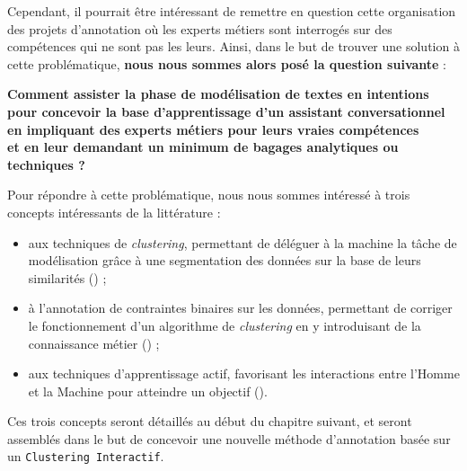 	
	Cependant, il pourrait être intéressant de remettre en question cette organisation des projets d'annotation où les experts métiers sont interrogés sur des compétences qui ne sont pas les leurs.
	Ainsi, dans le but de trouver une solution à cette problématique, \textbf{nous nous sommes alors posé la question suivante} :
	\begin{leftBarImportantGreen}
		\begin{center}
		\textbf{
			Comment assister la phase de modélisation de textes en intentions \\
			pour concevoir la base d'apprentissage d'un assistant conversationnel \\
			en impliquant des experts métiers pour leurs vraies compétences \\
			et en leur demandant un minimum de bagages analytiques ou techniques ?
		}
		\end{center}
	\end{leftBarImportantGreen}
	
	
	\begin{leftBarIdea}
		Pour répondre à cette problématique, nous nous sommes intéressé à trois concepts intéressants de la littérature :
		\begin{itemize}
			\item aux techniques de \textit{clustering}, permettant de déléguer à la machine la tâche de modélisation grâce à une segmentation des données sur la base de leurs similarités (\cite{xu-tian:2015:comprehensive-survey-clustering}) ;
			\item à l'annotation de contraintes binaires sur les données, permettant de corriger le fonctionnement d'un algorithme de \textit{clustering} en y introduisant de la connaissance métier (\cite{lampert-etal:2018:constrained-distance-based}) ;
			\item aux techniques d'apprentissage actif, favorisant les interactions entre l'Homme et la Machine pour atteindre un objectif (\cite{settles:2010:active-learning-literature}).
		\end{itemize}
		Ces trois concepts seront détaillés au début du chapitre suivant, et seront assemblés dans le but de concevoir une nouvelle méthode d'annotation basée sur un \texttt{Clustering Interactif}.
	\end{leftBarIdea}